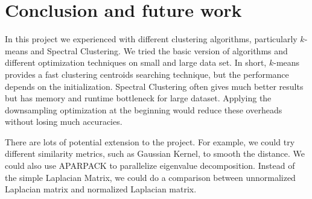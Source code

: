 \documentclass{acm_proc_article-sp}
\begin{document}
\section{Conclusion and future work}

In this project we experienced with different clustering algorithms, particularly $k$-means and Spectral Clustering. We tried the basic version of algorithms and different optimization techniques on small and large data set. In short, $k$-means provides a fast clustering centroids searching technique, but the performance depends on the initialization. Spectral Clustering often gives much better results but has memory and runtime bottleneck for large dataset. Applying the downsampling optimization at the beginning would reduce these overheads without losing much accuracies.  

There are lots of potential extension to the project. For example, we could try different similarity metrics, such as Gaussian Kernel, to smooth the distance. We could also use APARPACK to parallelize eigenvalue decomposition. Instead of the simple Laplacian Matrix, we could do a comparison  between unnormalized Laplacian matrix and normalized Laplacian matrix.

%
%

\balancecolumns
\end{document}
